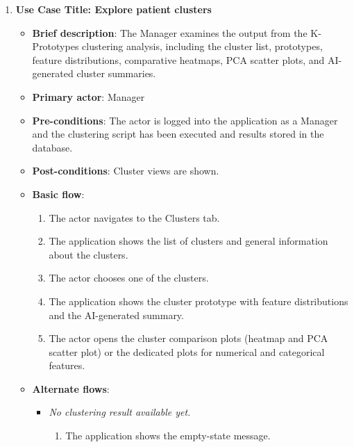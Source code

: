 \begin{enumerate}
\item \textbf{Use Case Title: Explore patient clusters}
\begin{itemize}
    \item \textbf{Brief description}: The Manager examines the output from the K-Prototypes clustering analysis, including the cluster list, prototypes, feature distributions, comparative heatmaps, PCA scatter plots, and AI-generated cluster summaries.
    \item \textbf{Primary actor}: Manager
    \item \textbf{Pre-conditions}: The actor is logged into the application as a Manager and the clustering script has been executed and results stored in the database.
    \item \textbf{Post-conditions}: Cluster views are shown.
    \item \textbf{Basic flow}:
    \begin{enumerate}
        \item The actor navigates to the Clusters tab.
        \item The application shows the list of clusters and general information about the clusters.
        \item The actor chooses one of the clusters.
        \item The application shows the cluster prototype with feature distributions and the AI-generated summary.
        \item The actor opens the cluster comparison plots (heatmap and PCA scatter plot) or the dedicated plots for numerical and categorical features.
    \end{enumerate}
    \item \textbf{Alternate flows}:
    \begin{itemize}
        \item[1a.] \textit{No clustering result available yet.}
        \begin{enumerate}
            \item The application shows the empty-state message.
        \end{enumerate}
    \end{itemize}
\end{itemize}

\vspace{0.5em}


\end{enumerate}
